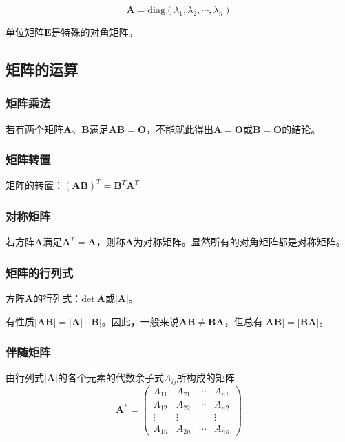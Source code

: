 \documentclass[12pt, a4paper, oneside]{ctexart}
\begin{document}
\begin{equation*}
  \mathbf{A}=\text{diag}(\lambda_1, \lambda_2,\cdots,\lambda_n)
\end{equation*}

单位矩阵$\mathbf{E}$是特殊的对角矩阵。

\subsection{矩阵的运算}

\subsubsection{矩阵乘法}

若有两个矩阵$\mathbf{A}$、$\mathbf{B}$满足$\mathbf{AB}=\mathbf{O}$，不能就此得出$\mathbf{A}=\mathbf{O}$或$\mathbf{B}=\mathbf{O}$的结论。

\subsubsection{矩阵转置}

矩阵的转置：$(\mathbf{AB})^T=\mathbf{B}^T \mathbf{A}^T$

\subsubsection{对称矩阵}

若方阵$\mathbf{A}$满足$\mathbf{A}^T=\mathbf{A}$，则称$\mathbf{A}$为对称矩阵。显然所有的对角矩阵都是对称矩阵。

\subsubsection{矩阵的行列式}

方阵$\mathbf{A}$的行列式：$\text{det}\ \mathbf{A}$或$|\mathbf{A}|$。

有性质$|\mathbf{AB}|=|\mathbf{A}|\cdot |\mathbf{B}|$。因此，一般来说$\mathbf{AB}\neq\mathbf{BA}$，但总有$|\mathbf{AB}|=|\mathbf{BA}|$。

\subsubsection{伴随矩阵}

由行列式$|\mathbf{A}|$的各个元素的代数余子式$A_{ij}$所构成的矩阵
\begin{equation*}
  \mathbf{A}^{*}=\begin{pmatrix}
    A_{11} & A_{21} & \cdots & A_{n1} \\
    A_{12} & A_{22} & \cdots & A_{n2} \\
    \vdots & \vdots & & \vdots \\
    A_{1n} & A_{2n} & \cdots & A_{nn}
  \end{pmatrix}
\end{equation*}
\end{document}
